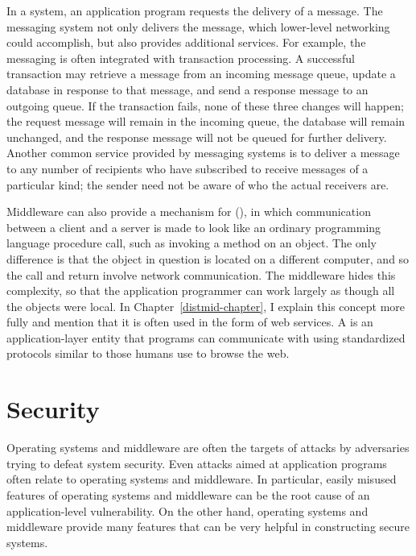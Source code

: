In a  system, an application program requests the
delivery of a message.  The messaging system not only delivers the
message, which lower-level networking could accomplish, but also
provides additional services.  For example, the messaging is often
integrated with transaction processing.  A successful transaction may
retrieve a message from an incoming message queue, update a database in
response to that message, and send a response message to an outgoing
queue.  If the transaction fails, none of these three changes will
happen; the request message will remain in the incoming queue, the
database will remain unchanged, and the response message will not be
queued for further delivery.  Another common service provided by
messaging systems is to deliver a message to any number of recipients
who have subscribed to receive messages of a particular kind;  the
sender need not be aware of who the actual receivers are.

Middleware can also provide a mechanism for  (), in which communication between a client and a
server is made to look like an ordinary programming language procedure
call, such as invoking a method on an object.  The only difference is
that the object in question is located on a different computer, and so
the call and return involve network communication.  The middleware
hides this complexity, so that the application programmer can work
largely as though all the objects were local.  In
Chapter~\ref{distmid-chapter}, I explain this concept more fully and
mention that it is often used in the form of web services.  A  is an application-layer entity that programs can
communicate with using standardized protocols similar to those humans
use to browse the web.

\section{Security}\label{intro-security-section}

Operating systems and middleware are often the targets of attacks by
adversaries trying to defeat system security.  Even attacks aimed at
application programs often relate to operating systems and middleware.
In particular, easily misused features of operating systems and
middleware can be the root cause of an application-level
vulnerability.  On the other hand, operating systems and middleware
provide many features that can be very helpful in constructing secure
systems.

